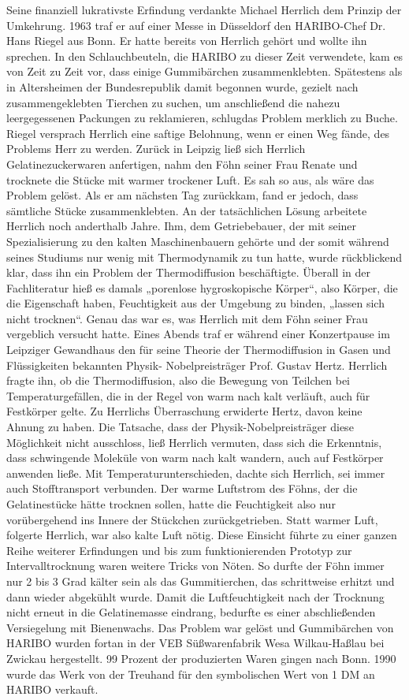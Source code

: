 \documentclass[11pt,a4paper]{article}
\begin{document}
Seine finanziell lukrativste Erfindung verdankte Michael Herrlich dem Prinzip
der Umkehrung. 1963 traf er auf einer Messe in Düsseldorf den HARIBO-Chef
Dr. Hans Riegel aus Bonn. Er hatte bereits von Herrlich gehört und wollte ihn
sprechen. In den Schlauchbeuteln, die HARIBO zu dieser Zeit verwendete, kam es
von Zeit zu Zeit vor, dass einige Gummibärchen zusammenklebten. Spätestens als
in Altersheimen der Bundesrepublik damit begonnen wurde, gezielt nach
zusammengeklebten Tierchen zu suchen, um anschließend die nahezu
leergegessenen Packungen zu reklamieren, schlugdas Problem merklich zu
Buche. Riegel versprach Herrlich eine saftige Belohnung, wenn er einen Weg
fände, des Problems Herr zu werden. Zurück in Leipzig ließ sich Herrlich
Gelatinezuckerwaren anfertigen, nahm den Föhn seiner Frau Renate und trocknete
die Stücke mit warmer trockener Luft. Es sah so aus, als wäre das Problem
gelöst. Als er am nächsten Tag zurückkam, fand er jedoch, dass sämtliche
Stücke zusammenklebten. An der tatsächlichen Lösung arbeitete Herrlich noch
anderthalb Jahre. Ihm, dem Getriebebauer, der mit seiner Spezialisierung zu
den kalten Maschinenbauern gehörte und der somit während seines Studiums nur
wenig mit Thermodynamik zu tun hatte, wurde rückblickend klar, dass ihn ein
Problem der Thermodiffusion beschäftigte. Überall in der Fachliteratur hieß es
damals „porenlose hygroskopische Körper“, also Körper, die die Eigenschaft
haben, Feuchtigkeit aus der Umgebung zu binden, „lassen sich nicht
trocknen“. Genau das war es, was Herrlich mit dem Föhn seiner Frau vergeblich
versucht hatte. Eines Abends traf er während einer Konzertpause im Leipziger
Gewandhaus den für seine Theorie der Thermodiffusion in Gasen und
Flüssigkeiten bekannten Physik- Nobelpreisträger Prof. Gustav Hertz. Herrlich
fragte ihn, ob die Thermodiffusion, also die Bewegung von Teilchen bei
Temperaturgefällen, die in der Regel von warm nach kalt verläuft, auch für
Festkörper gelte. Zu Herrlichs Überraschung erwiderte Hertz, davon keine
Ahnung zu haben. Die Tatsache, dass der Physik-Nobelpreisträger diese
Möglichkeit nicht ausschloss, ließ Herrlich vermuten, dass sich die
Erkenntnis, dass schwingende Moleküle von warm nach kalt wandern, auch auf
Festkörper anwenden ließe. Mit Temperaturunterschieden, dachte sich Herrlich,
sei immer auch Stofftransport verbunden. Der warme Luftstrom des Föhns, der
die Gelatinestücke hätte trocknen sollen, hatte die Feuchtigkeit also nur
vorübergehend ins Innere der Stückchen zurückgetrieben.  Statt warmer Luft,
folgerte Herrlich, war also kalte Luft nötig. Diese Einsicht führte zu einer
ganzen Reihe weiterer Erfindungen und bis zum funktionierenden Prototyp zur
Intervalltrocknung waren weitere Tricks von Nöten. So durfte der Föhn immer
nur 2 bis 3 Grad kälter sein als das Gummitierchen, das schrittweise erhitzt
und dann wieder abgekühlt wurde. Damit die Luftfeuchtigkeit nach der Trocknung
nicht erneut in die Gelatinemasse eindrang, bedurfte es einer abschließenden
Versiegelung mit Bienenwachs. Das Problem war gelöst und Gummibärchen von
HARIBO wurden fortan in der VEB Süßwarenfabrik Wesa Wilkau-Haßlau bei Zwickau
hergestellt. 99 Prozent der produzierten Waren gingen nach Bonn. 1990 wurde
das Werk von der Treuhand für den symbolischen Wert von 1 DM an HARIBO
verkauft.
\end{document}
